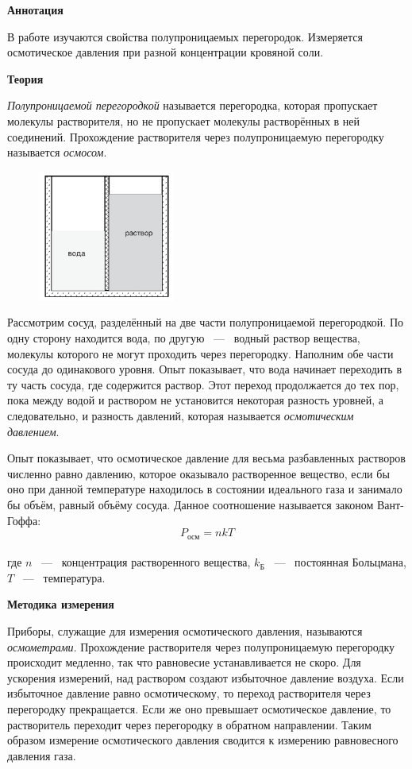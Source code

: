 \textbf{\Large Аннотация}

В работе изучаются свойства полупроницаемых перегородок. Измеряется осмотическое давления при разной концентрации кровяной соли. 

\textbf{\Large Теория}

\textit{Полупроницаемой перегородкой} называется перегородка, которая пропускает молекулы растворителя, но не пропускает молекулы растворённых в ней соединений. Прохождение растворителя через полупроницаемую перегородку называется \textit{осмосом}.

\begin{figure}
	\centering
	\includegraphics[width=0.4\textwidth]{../images/scheme_theory.png}
\end{figure}

Рассмотрим сосуд, разделённый на две части полупроницаемой перегородкой. По одну сторону находится вода, по другую ~---~ водный раствор вещества, молекулы которого не могут проходить через перегородку. Наполним обе части сосуда до одинакового уровня. Опыт показывает, что вода начинает переходить в ту часть сосуда, где содержится раствор. Этот переход продолжается до тех пор, пока между водой и раствором не установится некоторая разность уровней, а следовательно, и разность давлений, которая называется \textit{осмотическим давлением}.

Опыт показывает, что осмотическое давление для весьма разбавленных растворов численно равно давлению, которое оказывало растворенное вещество, если бы оно при данной температуре находилось в состоянии идеального газа и занимало бы объём, равный объёму сосуда. Данное соотношение называется законом Вант-Гоффа:
$$
P_{осм} = n k T
$$ \\
где $n$ ~---~ концентрация растворенного вещества, $k_Б$ ~---~ постоянная Больцмана, $T$ ~---~ температура.

\newpage

\textbf{\Large Методика измерения}

Приборы, служащие для измерения осмотического давления, называются \textit{осмометрами}. Прохождение растворителя через полупроницаемую перегородку происходит медленно, так что равновесие устанавливается не скоро. Для ускорения измерений, над раствором создают избыточное давление воздуха. Если избыточное давление равно осмотическому, то переход растворителя через перегородку прекращается. Если же оно превышает осмотическое давление, то растворитель переходит через перегородку в обратном направлении. Таким образом измерение осмотического давления сводится к измерению равновесного давления газа.

